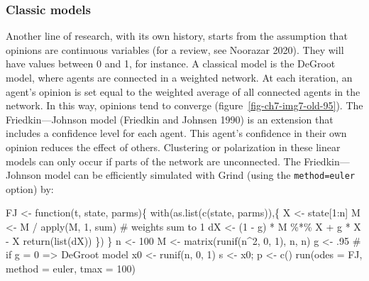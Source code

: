 \documentclass[
  a4paper,
  DIV=11,
  numbers=noendperiod,
  oneside]{scrreprt}
\newenvironment{Shaded}{}{}
\newcommand{\AttributeTok}[1]{\textcolor[rgb]{0.84,0.23,0.29}{#1}}
\newcommand{\CommentTok}[1]{\textcolor[rgb]{0.42,0.45,0.49}{#1}}
\newcommand{\ControlFlowTok}[1]{\textcolor[rgb]{0.84,0.23,0.29}{#1}}
\newcommand{\DecValTok}[1]{\textcolor[rgb]{0.00,0.36,0.77}{#1}}
\newcommand{\FunctionTok}[1]{\textcolor[rgb]{0.44,0.26,0.76}{#1}}
\newcommand{\NormalTok}[1]{\textcolor[rgb]{0.14,0.16,0.18}{#1}}
\newcommand{\OtherTok}[1]{\textcolor[rgb]{0.44,0.26,0.76}{#1}}
\newcommand{\SpecialCharTok}[1]{\textcolor[rgb]{0.00,0.36,0.77}{#1}}
\newcommand{\StringTok}[1]{\textcolor[rgb]{0.01,0.18,0.38}{#1}}
\begin{document}
\subsubsection{Classic models}\label{sec-Classic-models}

Another line of research, with its own history, starts from the
assumption that opinions are continuous variables (for a review, see
Noorazar 2020). They will have values between 0 and 1, for instance. A
classical model is the DeGroot model, where agents are connected in a
weighted network. At each iteration, an agent's opinion is set equal to
the weighted average of all connected agents in the network. In this
way, opinions tend to converge (figure~\ref{fig-ch7-img7-old-95}). The
Friedkin---Johnson model (Friedkin and Johnsen 1990) is an extension
that includes a confidence level for each agent. This agent's confidence
in their own opinion reduces the effect of others. Clustering or
polarization in these linear models can only occur if parts of the
network are unconnected. The Friedkin---Johnson model can be efficiently
simulated with Grind (using the
\texttt{method=\textquotesingle{}euler\textquotesingle{}} option) by:

\begin{Shaded}
\begin{Highlighting}[]
\NormalTok{FJ }\OtherTok{\textless{}{-}} \ControlFlowTok{function}\NormalTok{(t, state, parms)\{}
  \FunctionTok{with}\NormalTok{(}\FunctionTok{as.list}\NormalTok{(}\FunctionTok{c}\NormalTok{(state, parms)),\{}
\NormalTok{    X }\OtherTok{\textless{}{-}}\NormalTok{ state[}\DecValTok{1}\SpecialCharTok{:}\NormalTok{n]}
\NormalTok{    M }\OtherTok{\textless{}{-}}\NormalTok{ M }\SpecialCharTok{/} \FunctionTok{apply}\NormalTok{(M, }\DecValTok{1}\NormalTok{, sum) }\CommentTok{\# weights sum to 1}
\NormalTok{    dX }\OtherTok{\textless{}{-}}\NormalTok{ (}\DecValTok{1} \SpecialCharTok{{-}}\NormalTok{ g) }\SpecialCharTok{*}\NormalTok{ M }\SpecialCharTok{\%*\%}\NormalTok{ X  }\SpecialCharTok{+}\NormalTok{ g }\SpecialCharTok{*}\NormalTok{ X }\SpecialCharTok{{-}}\NormalTok{ X}
    \FunctionTok{return}\NormalTok{(}\FunctionTok{list}\NormalTok{(dX))}
\NormalTok{  \})}
\NormalTok{\}}
\NormalTok{n }\OtherTok{\textless{}{-}} \DecValTok{100}
\NormalTok{M }\OtherTok{\textless{}{-}} \FunctionTok{matrix}\NormalTok{(}\FunctionTok{runif}\NormalTok{(n}\SpecialCharTok{\^{}}\DecValTok{2}\NormalTok{, }\DecValTok{0}\NormalTok{, }\DecValTok{1}\NormalTok{), n, n)}
\NormalTok{g }\OtherTok{\textless{}{-}}\NormalTok{ .}\DecValTok{95} \CommentTok{\# if g  = 0 =\textgreater{} DeGroot model}
\NormalTok{x0 }\OtherTok{\textless{}{-}} \FunctionTok{runif}\NormalTok{(n, }\DecValTok{0}\NormalTok{, }\DecValTok{1}\NormalTok{)}
\NormalTok{s }\OtherTok{\textless{}{-}}\NormalTok{ x0; p }\OtherTok{\textless{}{-}} \FunctionTok{c}\NormalTok{() }
\FunctionTok{run}\NormalTok{(}\AttributeTok{odes =}\NormalTok{ FJ, }\AttributeTok{method =} \StringTok{\textquotesingle{}euler\textquotesingle{}}\NormalTok{, }\AttributeTok{tmax =} \DecValTok{100}\NormalTok{)}
\end{Highlighting}
\end{Shaded}
\end{document}
